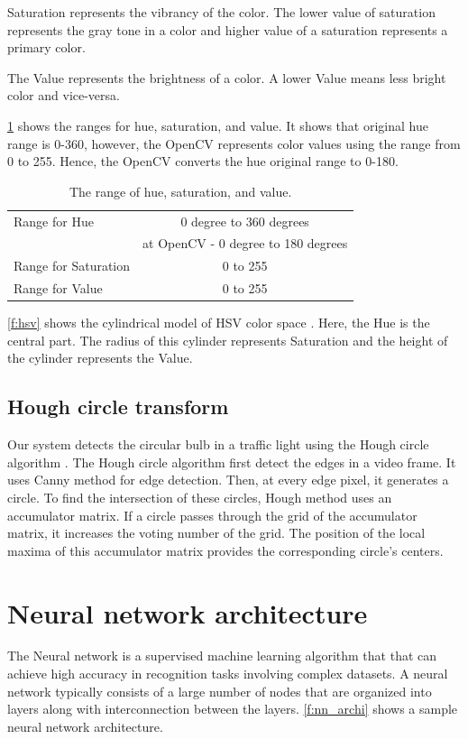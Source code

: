 Saturation represents the vibrancy of the color.
The lower value of saturation represents the gray tone in a color and higher value of a saturation represents a primary color.

The Value represents the brightness of a color.
A lower Value means less bright color and vice-versa.

\ref{t:hsv} shows the ranges for hue, saturation, and value.
It shows that original hue range is 0-360, however, the OpenCV \cite{opencv} represents color values using the range from 0 to 255. 
Hence, the OpenCV converts the hue original range to 0-180.

\begin{table}[h!]
  \centering
  \caption{The range of hue, saturation, and value.}
  \label{t:hsv}
  \begin{tabular}{  l  c  }
    \rowcolor{gray!50}
    \hline
    Range for Hue & 0 degree to 360 degrees \\
    \rowcolor{gray!50}    
    & at OpenCV - 0 degree to 180 degrees\\  
    Range for Saturation & 0 to 255 \\
    Range for Value & 0 to 255 \\
    \hline 
    
  \end{tabular}
\end{table}


\ref{f:hsv} shows the cylindrical model of HSV color space \cite{hsv}.
Here, the Hue is the central part.
The radius of this cylinder represents Saturation and the height of the cylinder represents the Value.

\subsection{Hough circle transform}
Our system detects the circular bulb in a traffic light using the Hough circle algorithm \cite{houghcir_alg}.
The Hough circle algorithm first detect the edges in a video frame.
It uses Canny method \cite{canny} for edge detection.
Then, at every edge pixel, it generates a circle.
To find the intersection of these circles, Hough method uses an accumulator matrix.
If a circle passes through the grid of the accumulator matrix, it increases the voting number of the grid.
The position of the local maxima of this accumulator matrix provides the corresponding circle's centers.

\section{Neural network architecture}
The Neural network is a supervised machine learning algorithm that that can achieve high accuracy in recognition tasks involving complex datasets. 
A neural network typically consists of a large number of nodes that are organized into layers along with interconnection between the layers. 
\ref{f:nn_archi} shows a sample neural network architecture.

